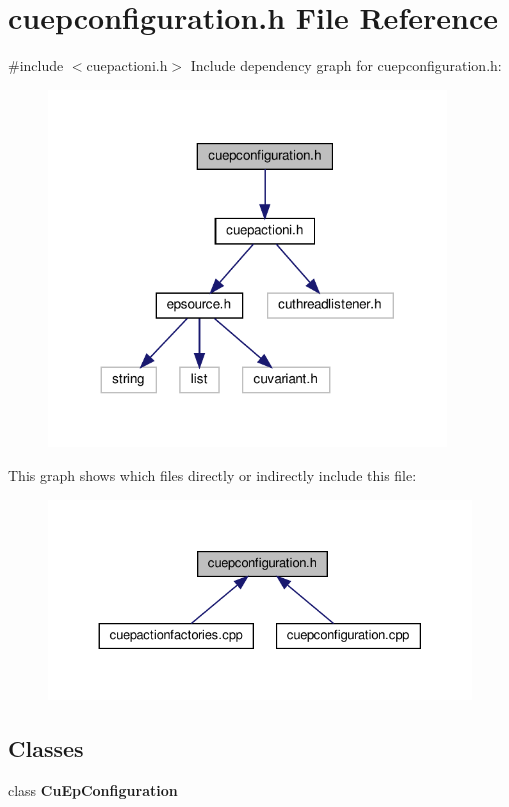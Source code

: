 \section{cuepconfiguration.\+h File Reference}
\label{cuepconfiguration_8h}
{\ttfamily \#include $<$cuepactioni.\+h$>$}\newline
Include dependency graph for cuepconfiguration.\+h\+:\nopagebreak
\begin{figure}[H]
\begin{center}
\leavevmode
\includegraphics[width=299pt]{cuepconfiguration_8h__incl}
\end{center}
\end{figure}
This graph shows which files directly or indirectly include this file\+:\nopagebreak
\begin{figure}[H]
\begin{center}
\leavevmode
\includegraphics[width=330pt]{cuepconfiguration_8h__dep__incl}
\end{center}
\end{figure}
\subsection*{Classes}
\begin{DoxyCompactItemize}
\item 
class \textbf{ Cu\+Ep\+Configuration}
\end{DoxyCompactItemize}
